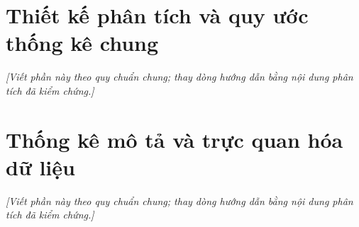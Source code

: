 \section{Thiết kế phân tích và quy ước thống kê chung}
\noindent\textit{[Viết phần này theo quy chuẩn chung; thay dòng hướng dẫn bằng nội dung phân tích đã kiểm chứng.]}

\section{Thống kê mô tả và trực quan hóa dữ liệu}
\noindent\textit{[Viết phần này theo quy chuẩn chung; thay dòng hướng dẫn bằng nội dung phân tích đã kiểm chứng.]}


